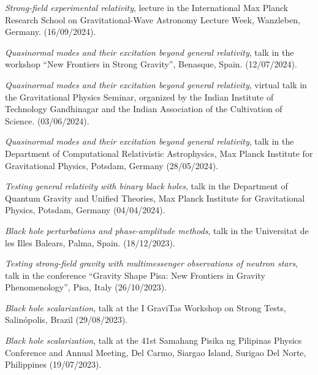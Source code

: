 \documentclass[10pt]{article}
\newcommand{\invited}{{\color{aeilbl}{invited}}}
\begin{document}
\begin{bibenum}
    \item \emph{Strong-field experimental relativity},
    \invited{} lecture in the International Max Planck Research School on Gravitational-Wave Astronomy Lecture Week,
    Wanzleben, Germany.
    \hfill (16/09/2024).

    \item \emph{Quasinormal modes and their excitation beyond general relativity},
    \invited{} talk in the workshop ``New Frontiers in Strong Gravity'',
    Benasque, Spain.
    \hfill (12/07/2024).

    \item \emph{Quasinormal modes and their excitation beyond general relativity},
    \invited{} virtual talk in the Gravitational Physics Seminar, organized by the Indian Institute of Technology Gandhinagar and the Indian Association of the Cultivation of Science.
    \hfill (03/06/2024).

    \item \emph{Quasinormal modes and their excitation beyond general relativity},
    \invited{} talk in the Department of Computational Relativistic Astrophysics, Max Planck Institute for Gravitational Physics, Potsdam, Germany
    \hfill (28/05/2024).

    \item \emph{Testing general relativity with binary black holes},
    \invited{} talk in the Department of Quantum Gravity and Unified Theories, Max Planck Institute for Gravitational Physics, Potsdam, Germany
    \hfill (04/04/2024).

    \item \emph{Black hole perturbations and phase-amplitude methods},
    \invited{} talk in the Universitat de les Illes Balears, Palma, Spain.
    \hfill (18/12/2023).

    \item \emph{Testing strong-field gravity with multimessenger observations of neutron stars},
    \invited{} talk in the conference ``Gravity Shape Pisa: New Frontiers in Gravity Phenomenology'',
    Pisa, Italy
    \hfill (26/10/2023).

    \item \emph{Black hole scalarization},
    \invited{} talk at the I GraviTas Workshop on Strong Tests, Salin\'opolis, Brazil
    \hfill (29/08/2023).

    \item \emph{Black hole scalarization},
    \invited{} talk at the 41st Samahang Pisika ng Pilipinas Physics Conference and Annual Meeting, Del Carmo, Siargao Island, Surigao Del Norte, Philippines
    \hfill (19/07/2023).


\end{bibenum}
\end{document}
